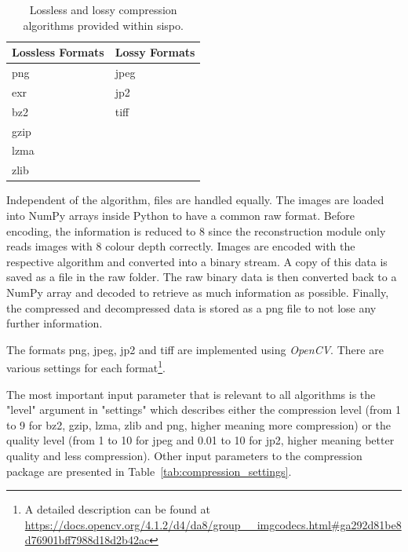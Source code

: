 \begin{table}[htb]
    \centering
    \caption{Lossless and lossy compression algorithms provided within \gls{sispo}.}
    \label{tab:compression_format}
    \begin{tabular}{l|l}
        \textbf{Lossless Formats} & \textbf{Lossy Formats} \\ \hline
        \gls{png}         & \gls{jpeg}           \\
        exr               & \gls{jp2}        \\
        bz2               & tiff           \\
        gzip              &                \\
        lzma              &                \\
        zlib              &               
    \end{tabular}
\end{table}

Independent of the algorithm, files are handled equally. The images are loaded into NumPy arrays inside Python to have a common raw format. Before encoding, the information is reduced to \SI{8}{\bit} since the reconstruction module only reads images with \SI{8}{\bit} colour depth correctly. Images are encoded with the respective algorithm and converted into a binary stream. A copy of this data is saved as a file in the raw folder. The raw binary data is then converted back to a NumPy array and decoded to retrieve as much information as possible. Finally, the compressed and decompressed data is stored as a \gls{png} file to not lose any further information.

The formats \gls{png}, \gls{jpeg}, \gls{jp2} and tiff are implemented using \textit{OpenCV}. There are various settings for each format\footnote{A detailed description can be found at \url{https://docs.opencv.org/4.1.2/d4/da8/group__imgcodecs.html\#ga292d81be8d76901bff7988d18d2b42ac}}.

The most important input parameter that is relevant to all algorithms is the "level" argument in "settings" which describes either the compression level (from 1 to 9 for bz2, gzip, lzma, zlib and \gls{png}, higher meaning more compression) or the quality level (from 1 to 10 for \gls{jpeg} and 0.01 to 10 for \gls{jp2}, higher meaning better quality and less compression). Other input parameters to the compression package are presented in Table~\ref{tab:compression_settings}.

